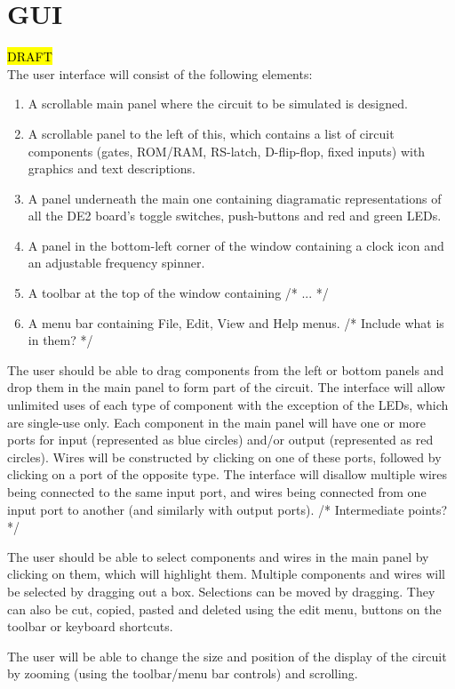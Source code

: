 \documentclass[12pt, a4paper, oneside,titlepage]{article}
\begin{document}
\section{GUI}
\hl{DRAFT}\\
The user interface will consist of the following elements:
\begin{enumerate}
\item A scrollable main panel where the circuit to be simulated is designed.
\item A scrollable panel to the left of this, which contains a list of circuit components (gates, ROM/RAM, RS-latch, D-flip-flop, fixed inputs) with graphics and text descriptions.
\item A panel underneath the main one containing diagramatic representations of all the DE2 board's toggle switches, push-buttons and red and green LEDs.
\item A panel in the bottom-left corner of the window containing a clock icon and an adjustable frequency spinner.
\item A toolbar at the top of the window containing /* ... */
\item A menu bar containing File, Edit, View and Help menus. /* Include what is in them? */
\end{enumerate}
The user should be able to drag components from the left or bottom panels and drop them in the main panel to form part of the circuit. The interface will allow unlimited uses of each type of component with the exception of the LEDs, which are single-use only. Each component in the main panel will have one or more ports for input (represented as blue circles) and/or output (represented as red circles). Wires will be constructed by clicking on one of these ports, followed by clicking on a port of the opposite type. The interface will disallow multiple wires being connected to the same input port, and wires being connected from one input port to another (and similarly with output ports). /* Intermediate points? */

The user should be able to select components and wires in the main panel by clicking on them, which will highlight them. Multiple components and wires will be selected by dragging out a box. Selections can be moved by dragging. They can also be cut, copied, pasted and deleted using the edit menu, buttons on the toolbar or keyboard shortcuts.

The user will be able to change the size and position of the display of the circuit by zooming (using the toolbar/menu bar controls) and scrolling.
\end{document}
